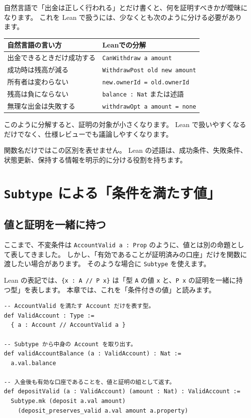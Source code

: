 自然言語で「出金は正しく行われる」とだけ書くと、何を証明すべきかが曖昧になります。
これを Lean で扱うには、少なくとも次のように分ける必要があります。

\begin{center}
\begin{tabular}{ll}
\toprule
自然言語の言い方 & Leanでの分解 \\
\midrule
出金できるときだけ成功する & \texttt{CanWithdraw a amount} \\
成功時は残高が減る & \texttt{WithdrawPost old new amount} \\
所有者は変わらない & \texttt{new.ownerId = old.ownerId} \\
残高は負にならない & \texttt{balance : Nat} または述語 \\
無理な出金は失敗する & \texttt{withdrawOpt a amount = none} \\
\bottomrule
\end{tabular}
\end{center}

このように分解すると、証明の対象が小さくなります。
Lean で扱いやすくなるだけでなく、仕様レビューでも議論しやすくなります。

関数名だけではこの区別を表せません。
Lean の述語は、成功条件、失敗条件、状態更新、保持する情報を明示的に分ける役割を持ちます。

\section{\texttt{Subtype} による「条件を満たす値」}

\subsection{値と証明を一緒に持つ}

ここまで、不変条件は \texttt{AccountValid a : Prop} のように、値とは別の命題として表してきました。
しかし、「有効であることが証明済みの口座」だけを関数に渡したい場合があります。
そのような場合に \texttt{Subtype} を使えます。

Lean の表記では、\texttt{\{x : A // P x\}} は「型 \texttt{A} の値 \texttt{x} と、\texttt{P x} の証明を一緒に持つ型」を表します。
本章では、これを「条件付きの値」と読みます。

\begin{listing}[htbp]
\begin{verbatim}
-- AccountValid を満たす Account だけを表す型。
def ValidAccount : Type :=
  { a : Account // AccountValid a }

-- Subtype から中身の Account を取り出す。
def validAccountBalance (a : ValidAccount) : Nat :=
  a.val.balance

-- 入金後も有効な口座であることを、値と証明の組として返す。
def depositValid (a : ValidAccount) (amount : Nat) : ValidAccount :=
  Subtype.mk (deposit a.val amount)
    (deposit_preserves_valid a.val amount a.property)
\end{verbatim}
\caption{\texttt{ValidAccount}}
\label{lst:ch10_subtype}
\end{listing}

